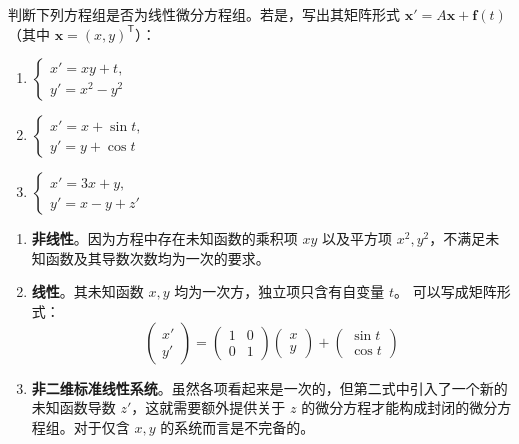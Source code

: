\documentclass[lang=cn,11pt]{elegantbook}
\begin{document}
\begin{exercise}[基础：概念辨析]
判断下列方程组是否为线性微分方程组。若是，写出其矩阵形式 $\mathbf{x}'=A\mathbf{x}+\mathbf{f}(t)$（其中 $\mathbf{x}=(x,y)^{\mathsf T}$）：
\begin{enumerate}
  \item[(1)] $\begin{cases}x'=xy+t,\\ y'=x^{2}-y^{2}\end{cases}$
  \item[(2)] $\begin{cases}x'=x+\sin t,\\ y'=y+\cos t\end{cases}$
  \item[(3)] $\begin{cases}x'=3x+y,\\ y'=x-y+z'\end{cases}$
\end{enumerate}
\end{exercise}
\begin{solution}
\begin{enumerate}
    \item[(1)] \textbf{非线性}。因为方程中存在未知函数的乘积项 $xy$ 以及平方项 $x^2, y^2$，不满足未知函数及其导数次数均为一次的要求。
    \item[(2)] \textbf{线性}。其未知函数 $x, y$ 均为一次方，独立项只含有自变量 $t$。
    可以写成矩阵形式：
    \[
    \begin{pmatrix} x' \\ y' \end{pmatrix} = \begin{pmatrix} 1 & 0 \\ 0 & 1 \end{pmatrix} \begin{pmatrix} x \\ y \end{pmatrix} + \begin{pmatrix} \sin t \\ \cos t \end{pmatrix}
    \]
    \item[(3)] \textbf{非二维标准线性系统}。虽然各项看起来是一次的，但第二式中引入了一个新的未知函数导数 $z'$，这就需要额外提供关于 $z$ 的微分方程才能构成封闭的微分方程组。对于仅含 $x, y$ 的系统而言是不完备的。
\end{enumerate}
\end{solution}
\end{document}
